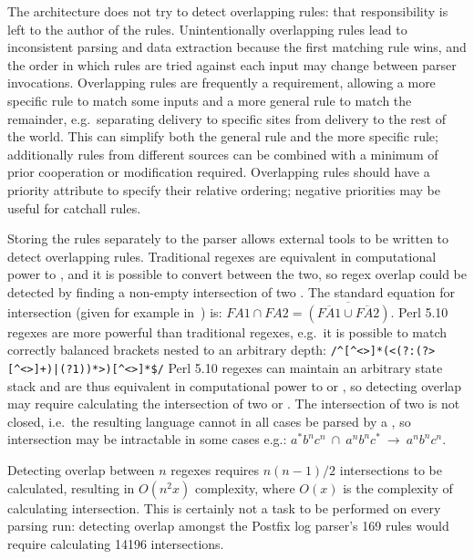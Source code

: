 \documentclass{svmult}
\newcommand{\tab}[0]{%
    \hspace*{2em}%
}
\newcommand{\numberOFrules}[0]{%
    169%
}
\newcommand{\numberOFruleINTERSECTIONS}[0]{%
    14196%
}
\begin{document}
The architecture does not try to detect overlapping rules: that
responsibility is left to the author of the rules.  Unintentionally
overlapping rules lead to inconsistent parsing and data extraction because
the first matching rule wins, and the order in which rules are tried
against each input may change between parser invocations.  Overlapping
rules are frequently a requirement, allowing a more specific rule to match
some inputs and a more general rule to match the remainder, e.g.\
separating \SMTP{} delivery to specific sites from \SMTP{} delivery to the
rest of the world.  This can simplify both the general rule and the more
specific rule; additionally rules from different sources can be combined
with a minimum of prior cooperation or modification required.  Overlapping
rules should have a priority attribute to specify their relative ordering;
negative priorities may be useful for catchall rules.

Storing the rules separately to the parser allows external tools to be
written to detect overlapping rules.  Traditional regexes are equivalent in
computational power to \FA{}, and it is possible to convert between the
two, so regex overlap could be detected by finding a non-empty intersection
of two \FA{}\@.  The standard equation for \FA{} intersection (given for
example in~\cite{intersection-of-NFA-using-Z}) is: $FA1 \cap{} FA2 =
\overline{(\overline{FA1} \cup{} \overline{FA2})}$.  Perl 5.10 regexes are
more powerful than traditional regexes, e.g.\ it is possible to match
correctly balanced brackets nested to an arbitrary depth:
\newline{}\tab{}\verb!/^[^<>]*(<(?:(?>[^<>]+)|(?1))*>)[^<>]*$/!\newline{}
Perl 5.10 regexes can maintain an arbitrary state stack and are thus
equivalent in computational power to \PDA{} or \CFL{}, so detecting overlap
may require calculating the intersection of two \PDA{} or \CFL{}\@.  The
intersection of two \CFL{} is not closed, i.e.\ the resulting language
cannot in all cases be parsed by a \CFL{}, so intersection may be
intractable in some cases e.g.:
$a^{*}b^{n}c^{n}~\cap~a^{n}b^{n}c^{*}~\rightarrow~a^{n}b^{n}c^{n}$.

Detecting overlap between $n$ regexes requires $n(n-1)/2$ intersections to
be calculated, resulting in $O(n^2x)$ complexity, where $O(x)$ is the
complexity of calculating intersection.  This is certainly not a task to be
performed on every parsing run: detecting overlap amongst the Postfix log
parser's \numberOFrules{} rules would require calculating
\numberOFruleINTERSECTIONS{} intersections.
\end{document}
